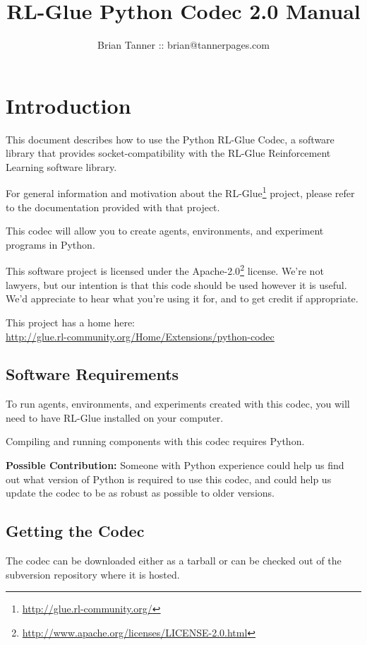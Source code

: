 \documentclass[11pt]{article}
\title{RL-Glue Python Codec 2.0 Manual }
\author{Brian Tanner ::  brian@tannerpages.com}
\date{}
\begin{document}
\maketitle
\tableofcontents

\section{Introduction}

This document describes how to use the Python RL-Glue Codec, a software library that provides socket-compatibility with the RL-Glue Reinforcement Learning software library.  

For general information and motivation about the RL-Glue\footnote{\url{http://glue.rl-community.org/}} project, please refer to the documentation provided with that project.

This codec will allow you to create agents, environments, and experiment programs in Python.

This software project is licensed under the Apache-2.0\footnote{\url{http://www.apache.org/licenses/LICENSE-2.0.html}} license. We're not lawyers, but our intention is that this code 
should be used however it is useful.  We'd appreciate to hear what you're using it for, and to get credit if appropriate.

This project has a home here:\\
\url{http://glue.rl-community.org/Home/Extensions/python-codec}


\subsection{Software Requirements}
To run agents, environments, and experiments created with this codec, you will need to have RL-Glue installed on your computer.

Compiling and running components with this codec requires Python.

\textbf{Possible Contribution: }Someone with Python experience could help us find out what version of Python is required to use this codec, and could help us update the codec
to be as robust as possible to older versions.

\subsection{Getting the Codec}
The codec can be downloaded either as a tarball or can be checked out of the subversion repository where it is hosted.
\end{document}
